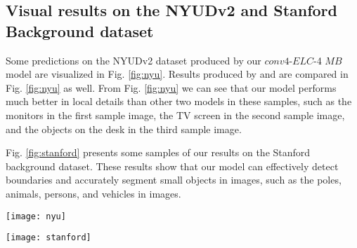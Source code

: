 \documentclass[10pt,twocolumn,letterpaper]{article}
\begin{document}
\subsection{Visual results on the NYUDv2 and Stanford Background dataset}
Some predictions on the NYUDv2 dataset produced by our $conv4$-$ELC$-4 $MB$ model are visualized in Fig. \ref{fig:nyu}. Results produced by \cite{2} and \cite{3} are compared in Fig. \ref{fig:nyu} as well. From Fig. \ref{fig:nyu} we can see that our model performs much better in local details than other two models in these samples, such as the monitors in the first sample image, the TV screen in the second sample image, and the objects on the desk in the third sample image.

Fig. \ref{fig:stanford} presents some samples of our results on the Stanford background dataset. These results show that our model can effectively detect boundaries and accurately segment small objects in images, such as the poles, animals, persons, and vehicles in images.




\begin{figure*}
\begin{center}
   \texttt{[image: nyu]}
\end{center}
   \caption{ Comparisons of results produced by FCN-8s \cite{3}, Eigen \textit{et al.} \cite{2}, and conv4-ELC-4 trained with median frequency balancing. Note that the black color denotes unknown categories. }
\label{fig:nyu}
\end{figure*}


\begin{figure*}
\begin{center}
   \texttt{[image: stanford]}
\end{center}
   \caption{ Visualization of prediction results on the Stanford background dataset produced by our $conv3$-$ELC$-$4$ $MB$ model. }
\label{fig:stanford}
\end{figure*}




{\small


}
\end{document}
